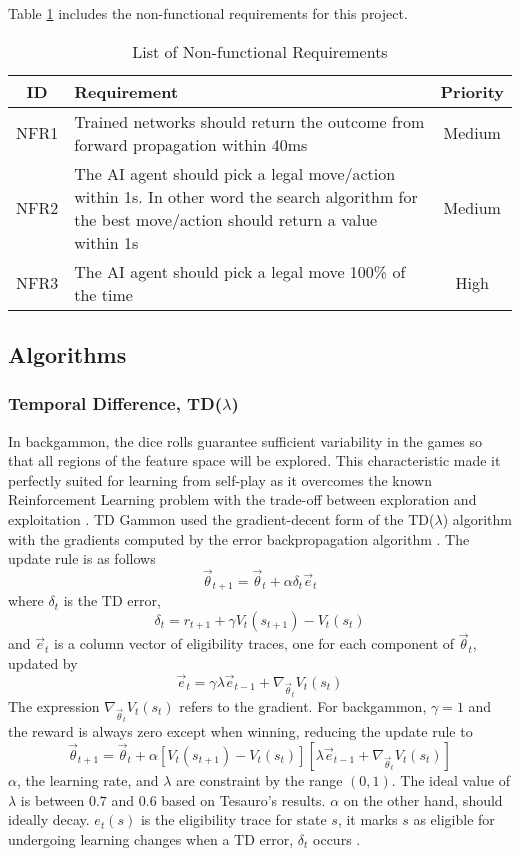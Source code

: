 \documentclass[12pt,a4paper]{article}
\begin{document}
Table \ref{nonreq} includes the non-functional requirements for this project.
\begin{table}[htb]
    \centering
    \caption{List of Non-functional Requirements}
    \vspace*{6pt}
    \label{nonreq}
    \begin{tabular}{cp{12cm}c}
        \hline
        \hline
        ID & Requirement & Priority \\ 
        \hline
        NFR1 & Trained networks should return the outcome from forward propagation within 40ms & Medium \\
        \hline
        NFR2 & The AI agent should pick a legal move/action within 1s. In other word the search algorithm for the best move/action should return a value within 1s & Medium \\
        \hline
        NFR3 & The AI agent should pick a legal move 100\% of the time & High \\
        \hline
    \end{tabular}
\end{table}
\subsection{Algorithms}
\subsubsection{Temporal Difference, TD($\lambda$)}
In backgammon, the dice rolls guarantee sufficient variability in the games so that all regions of the feature space will be explored. This characteristic made it perfectly suited for learning from self-play as it overcomes the known Reinforcement Learning problem with the trade-off between exploration and exploitation \cite{survey}. TD Gammon used the gradient-decent form of the TD($\lambda$) algorithm with the gradients computed by the error backpropagation algorithm \cite{rl}. The update rule is as follows
$$\vec{\theta}_{t+1} = \vec{\theta}_{t} + \alpha\delta_t\vec{e}_{t}$$ 
where $\delta_t$ is the TD error,
$$\delta_{t} = r_{t+1} + \gamma V_t(s_{t+1}) - V_t(s_t)$$ 
and $\vec{e}_t$ is a column vector of eligibility traces, one for each component of $\vec{\theta}_t$, updated by 
$$\vec{e}_{t} = \gamma\lambda\vec{e}_{t-1} + \nabla_{\vec{\theta}_{t}}V_t(s_t)$$ 
The expression $\nabla_{\vec{\theta}_{t}}V_t(s_t)$ refers to the gradient. For backgammon, $\gamma=1$ and the reward is always zero except when winning, reducing the update rule to
$$\vec{\theta}_{t+1} = \vec{\theta}_{t} + \alpha[V_t(s_{t+1}) - V_t(s_t)][\lambda\vec{e}_{t-1} + \nabla_{\vec{\theta}_{t}}V_t(s_t)]$$
$\alpha$, the learning rate, and $\lambda$ are constraint by the range $(0,1)$. The ideal value of $\lambda$ is between $0.7$ and $0.6$ based on Tesauro's \citeyear{DBLP:journals/ai/Tesauro02} results. $\alpha$ on the other hand, should ideally decay. $e_t(s)$ is the eligibility trace for state $s$, it marks $s$ as eligible for undergoing learning changes when a TD error, $\delta_t$ occurs \cite{rl}.
\end{document}

